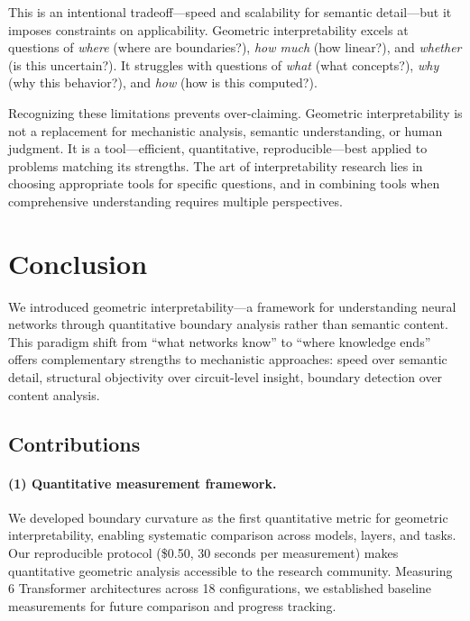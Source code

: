\documentclass[11pt]{article}
\begin{document}
This is an intentional tradeoff—speed and scalability for semantic detail—but it imposes constraints on applicability. Geometric interpretability excels at questions of \textit{where} (where are boundaries?), \textit{how much} (how linear?), and \textit{whether} (is this uncertain?). It struggles with questions of \textit{what} (what concepts?), \textit{why} (why this behavior?), and \textit{how} (how is this computed?).

Recognizing these limitations prevents over-claiming. Geometric interpretability is not a replacement for mechanistic analysis, semantic understanding, or human judgment. It is a tool—efficient, quantitative, reproducible—best applied to problems matching its strengths. The art of interpretability research lies in choosing appropriate tools for specific questions, and in combining tools when comprehensive understanding requires multiple perspectives.

\section{Conclusion}
\label{sec:conclusion}

We introduced geometric interpretability---a framework for understanding neural networks through quantitative boundary analysis rather than semantic content. This paradigm shift from ``what networks know'' to ``where knowledge ends'' offers complementary strengths to mechanistic approaches: speed over semantic detail, structural objectivity over circuit-level insight, boundary detection over content analysis.

\subsection{Contributions}

\paragraph{(1) Quantitative measurement framework.} We developed boundary curvature as the first
quantitative metric for geometric interpretability, enabling systematic comparison across models,
layers, and tasks. Our reproducible protocol (\$0.50, 30 seconds per measurement) makes quantitative geometric analysis accessible to the research community. Measuring 6 Transformer architectures across 18 configurations, we established baseline measurements for future comparison and
progress tracking.
\end{document}
